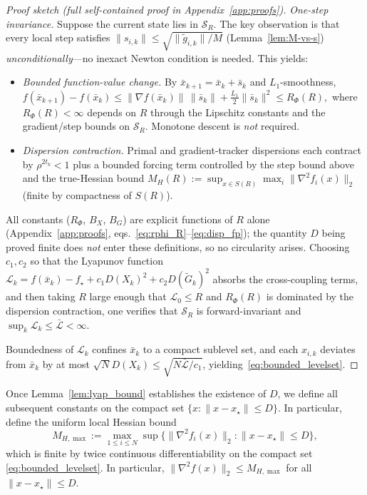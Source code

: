 \documentclass[11pt,a4paper]{article}
\begin{document}
\begin{proof}[Proof sketch (full self-contained proof in Appendix~\ref{app:proofs})]
	\emph{One-step invariance.}
	Suppose the current state lies in $\mathcal S_R$.
	The key observation is that every local step satisfies
	$\|s_{i,k}\|\le\sqrt{\|\tilde g_{i,k}\|/M}$
	(Lemma~\ref{lem:M-vs-s})
	\emph{unconditionally}---no inexact Newton condition is needed.
	This yields:
	\begin{itemize}[leftmargin=1.2em,itemsep=1pt]
	  \item \emph{Bounded function-value change.}
	        By $\bar x_{k+1}=\bar x_k+\bar s_k$ and $L_1$-smoothness,
	        \(
	        f(\bar x_{k+1})-f(\bar x_k)
	        \le \|\nabla f(\bar x_k)\|\,\|\bar s_k\|
	            +\tfrac{L_1}{2}\|\bar s_k\|^2
	        \le R_\Phi(R),
	        \)
	        where $R_\Phi(R)<\infty$ depends on $R$ through the Lipschitz
	        constants and the gradient/step bounds on $\mathcal S_R$.
	        Monotone descent is \emph{not} required.
	  \item \emph{Dispersion contraction.}
	        Primal and gradient-tracker dispersions each contract by
	        $\rho^{2t_k}<1$ plus a bounded forcing term controlled by
	        the step bound above and the true-Hessian bound
	        $M_H(R):=\sup_{x\in S(R)}\max_i\|\nabla^2 f_i(x)\|_2$
	        (finite by compactness of $S(R)$).
	\end{itemize}
	All constants ($R_\Phi$, $B_X$, $B_G$) are explicit functions of
	$R$ alone (Appendix~\ref{app:proofs},
	eqs.~\eqref{eq:rphi_R}--\eqref{eq:disp_fp});
	the quantity $D$ being proved finite does \emph{not} enter these
	definitions, so no circularity arises.
	Choosing $c_1,c_2$ so that the Lyapunov function
	$\mathcal L_k=f(\bar x_k)-f_\star+c_1D(X_k)^2+c_2D(\tilde G_k)^2$
	absorbs the cross-coupling terms, and then taking $R$ large enough
	that $\mathcal L_0\le R$ and $R_\Phi(R)$ is dominated by the
	dispersion contraction, one verifies that $\mathcal S_R$ is
	forward-invariant and
	$\sup_{k}\mathcal L_k\le\bar{\mathcal L}<\infty$.

	Boundedness of $\mathcal L_k$ confines $\bar x_k$ to a compact sublevel set,
	and each $x_{i,k}$ deviates from $\bar x_k$ by at most
	$\sqrt{N}D(X_k)\le\sqrt{N\bar{\mathcal L}/c_1}$,
	yielding~\eqref{eq:bounded_levelset}.
	\end{proof}

	Once Lemma~\ref{lem:lyap_bound} establishes the existence of $D$,
	we define all subsequent constants on the compact set $\{x:\|x-x_\star\|\le D\}$.
	In particular, define the uniform local Hessian bound
	\begin{equation}\label{eq:MHmax_def}
		M_{H,\max}\!:=\!\max_{1\le i\le N}\sup\{\|\nabla^2 f_i(x)\|_2:\|x\!-\!x_\star\|\!\le\! D\},
	\end{equation}
	which is finite by twice continuous differentiability on the compact set \eqref{eq:bounded_levelset}.
	In particular, $\|\nabla^2 f(x)\|_2\le M_{H,\max}$ for all $\|x-x_\star\|\le D$.
\end{document}

